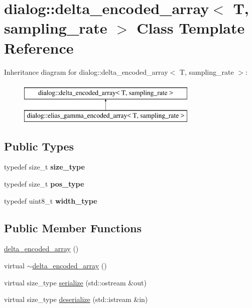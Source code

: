 \hypertarget{classdialog_1_1delta__encoded__array}{}\section{dialog\+:\+:delta\+\_\+encoded\+\_\+array$<$ T, sampling\+\_\+rate $>$ Class Template Reference}
\label{classdialog_1_1delta__encoded__array}
Inheritance diagram for dialog\+:\+:delta\+\_\+encoded\+\_\+array$<$ T, sampling\+\_\+rate $>$\+:\begin{figure}[H]
\begin{center}
\leavevmode
\includegraphics[height=2.000000cm]{classdialog_1_1delta__encoded__array}
\end{center}
\end{figure}
\subsection*{Public Types}
\begin{DoxyCompactItemize}
\item 
\mbox{\label{classdialog_1_1delta__encoded__array_a0cd3b42e267ec14eeb48f76bf3211c8f}} 
typedef size\+\_\+t {\bfseries size\+\_\+type}
\item 
\mbox{\label{classdialog_1_1delta__encoded__array_a9ed959d0d2070fa3044847cf4c3bbc12}} 
typedef size\+\_\+t {\bfseries pos\+\_\+type}
\item 
\mbox{\label{classdialog_1_1delta__encoded__array_aaa88ddf82d3790ea40350b14931c515e}} 
typedef uint8\+\_\+t {\bfseries width\+\_\+type}
\end{DoxyCompactItemize}
\subsection*{Public Member Functions}
\begin{DoxyCompactItemize}
\item 
\hyperlink{classdialog_1_1delta__encoded__array_a3b5f62d85c360a2ac4bc30db2b790d8d}{delta\+\_\+encoded\+\_\+array} ()
\item 
virtual \hyperlink{classdialog_1_1delta__encoded__array_acdf15405bdd9cebcbe8de93a797516cb}{$\sim$delta\+\_\+encoded\+\_\+array} ()
\item 
virtual size\+\_\+type \hyperlink{classdialog_1_1delta__encoded__array_a533eeb8833bb554513c86eb7f1ce635f}{serialize} (std\+::ostream \&out)
\item 
virtual size\+\_\+type \hyperlink{classdialog_1_1delta__encoded__array_aced4bc1f11a264fe3263b89be0e55d33}{deserialize} (std\+::istream \&in)
\end{DoxyCompactItemize}
